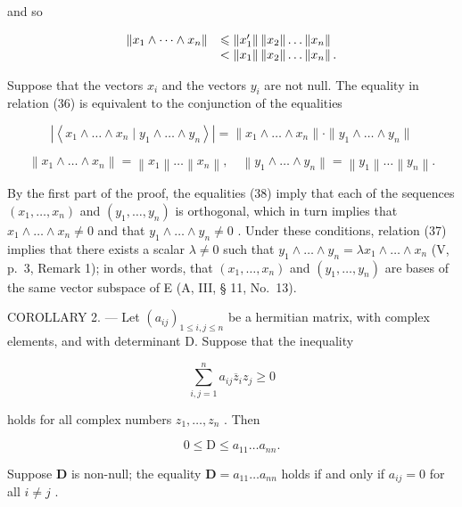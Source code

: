 and so

\[
\begin{array}{r l} \left\| x _ {1} \wedge \dots \wedge x _ {n} \right\| & \leqslant \left\| x _ {1} ^ {\prime} \right\| \left\| x _ {2} \right\| \dots \left\| x _ {n} \right\| \\ & <   \left\| x _ {1} \right\| \left\| x _ {2} \right\| \dots \left\| x _ {n} \right\|. \end{array}
\]

Suppose that the vectors \(x_{i}\) and the vectors \(y_{i}\) are not null. The equality in relation (36) is equivalent to the conjunction of the equalities

\[
\left| \left\langle x _ {1} \wedge \dots \wedge x _ {n} \mid y _ {1} \wedge \dots \wedge y _ {n} \right\rangle \right| = \| x _ {1} \wedge \dots \wedge x _ {n} \| \cdot \| y _ {1} \wedge \dots \wedge y _ {n} \|\tag{37}
\]

\[
\left\| x _ {1} \wedge \dots \wedge x _ {n} \right\| = \left\| x _ {1} \right\| \dots \left\| x _ {n} \right\|, \quad \left\| y _ {1} \wedge \dots \wedge y _ {n} \right\| = \left\| y _ {1} \right\| \dots \left\| y _ {n} \right\|.\tag{38}
\]

By the first part of the proof, the equalities (38) imply that each of the sequences \((x_{1},\ldots ,x_{n})\) and \((y_{1},\ldots ,y_{n})\) is orthogonal, which in turn implies that \(x_{1}\wedge \ldots \wedge x_{n}\neq 0\) and that \(y_{1}\wedge \ldots \wedge y_{n}\neq 0\) . Under these conditions, relation (37) implies that there exists a scalar \(\lambda \neq 0\) such that \(y_{1}\wedge \ldots \wedge y_{n} = \lambda x_{1}\wedge \ldots \wedge x_{n}\) (V, p.~3, Remark 1); in other words, that \((x_{1},\dots,x_{n})\) and \((y_{1},\dots,y_{n})\) are bases of the same vector subspace of E (A, III, § 11, No.~13).

COROLLARY 2. --- Let \((a_{ij})_{1\leqslant i,j\leqslant n}\) be a hermitian matrix, with complex elements, and with determinant D. Suppose that the inequality

\[
\sum_ {i, j = 1} ^ {n} a _ {i j} \overline {{z}} _ {i} z _ {j} \geqslant 0\tag{39}
\]

holds for all complex numbers \(z_{1}, \ldots, z_{n}\) . Then

\[
0 \leqslant \mathrm{D} \leqslant a _ {1 1} \dots a _ {n n}.\tag{40}
\]

Suppose \(\mathbf{D}\) is non-null; the equality \(\mathbf{D} = a_{11} \ldots a_{nn}\) holds if and only if \(a_{ij} = 0\) for all \(i \neq j\) .

